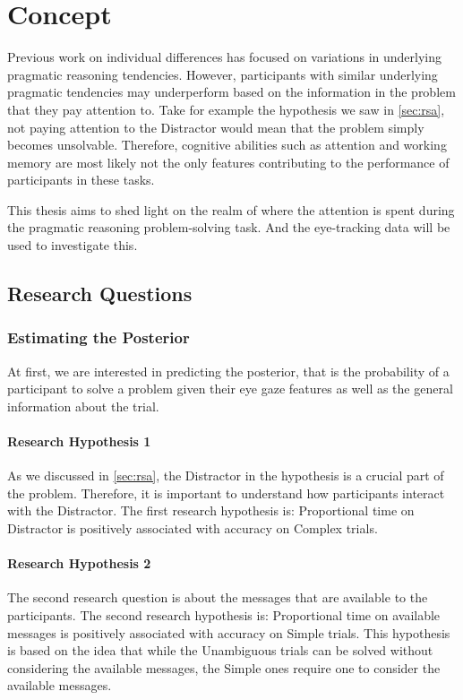 ﻿\chapter{Concept}
 
Previous work on individual differences \citep{Franke_2016} has focused on variations in underlying pragmatic reasoning tendencies. However, participants with similar underlying pragmatic tendencies may underperform based on the information in the problem that they pay attention to. Take for example the hypothesis we saw in \autoref{sec:rsa}, not paying attention to the Distractor would mean that the problem simply becomes unsolvable. Therefore, cognitive abilities such as attention and working memory are most likely not the only features contributing to the performance of participants in these tasks.

This thesis aims to shed light on the realm of where the attention is spent during the pragmatic reasoning problem-solving task. And the eye-tracking data will be used to investigate this. 

\section{Research Questions}
\label{sec:research_questions}

\subsection{Estimating the Posterior}
\label{sec:posterior}
At first, we are interested in predicting the posterior, that is the probability of a participant to solve a problem given their eye gaze features as well as the general information about the trial.

\subsubsection{Research Hypothesis 1}
\label{sec:h1}
As we discussed in \autoref{sec:rsa}, the Distractor in the hypothesis is a crucial part of the problem. Therefore, it is important to understand how participants interact with the Distractor. The first research hypothesis is: Proportional time on Distractor is positively associated with accuracy on Complex trials.

\subsubsection{Research Hypothesis 2}
\label{sec:h2}
The second research question is about the messages that are available to the participants. The second research hypothesis is: Proportional time on available messages is positively associated with accuracy on Simple trials. This hypothesis is based on the idea that while the Unambiguous trials can be solved without considering the available messages, the Simple ones require one to consider the available messages.

